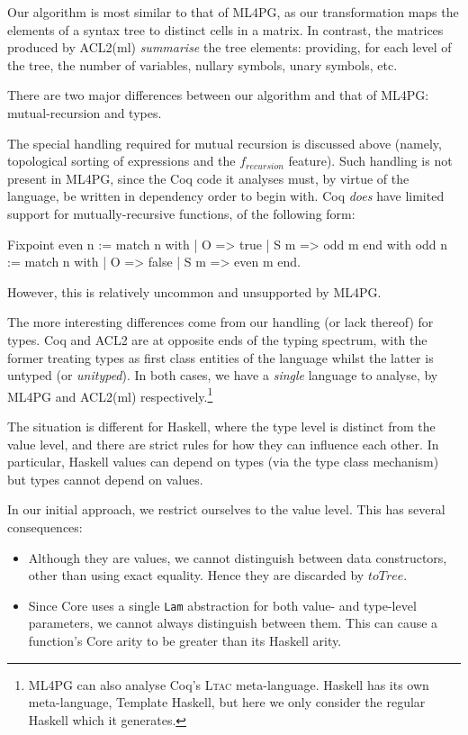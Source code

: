 Our algorithm is most similar to that of ML4PG, as our transformation maps the elements of a syntax tree to distinct cells in a matrix. In contrast, the matrices produced by ACL2(ml) \emph{summarise} the tree elements: providing, for each level of the tree, the number of variables, nullary symbols, unary symbols, etc.

There are two major differences between our algorithm and that of ML4PG: mutual-recursion and types.

The special handling required for mutual recursion is discussed above (namely, topological sorting of expressions and the $f_{recursion}$ feature). Such handling is not present in ML4PG, since the Coq code it analyses must, by virtue of the language, be written in dependency order to begin with. Coq \emph{does} have limited support for mutually-recursive functions, of the following form:

\begin{coqblock}
Fixpoint even n := match n with
                       | O   => true
                       | S m => odd m
                   end
    with odd  n := match n with
                       | O   => false
                       | S m => even m
                   end.
\end{coqblock}

However, this is relatively uncommon and unsupported by ML4PG.

The more interesting differences come from our handling (or lack thereof) for types. Coq and ACL2 are at opposite ends of the typing spectrum, with the former treating types as first class entities of the language whilst the latter is untyped (or \emph{unityped}). In both cases, we have a \emph{single} language to analyse, by ML4PG and ACL2(ml) respectively.\footnote{ML4PG can also analyse Coq's \textsc{Ltac} meta-language. Haskell has its own meta-language, Template Haskell, but here we only consider the regular Haskell which it generates.}

The situation is different for Haskell, where the type level is distinct from the value level, and there are strict rules for how they can influence each other. In particular, Haskell values can depend on types (via the type class mechanism) but types cannot depend on values.

In our initial approach, we restrict ourselves to the value level. This has several consequences:

\begin{itemize}
  \item Although they are values, we cannot distinguish between data constructors, other than using exact equality. Hence they are discarded by $toTree$.
  \item Since Core uses a single \texttt{Lam} abstraction for both value- and type-level parameters, we cannot always distinguish between them. This can cause a function's Core arity to be greater than its Haskell arity.
\end{itemize}

